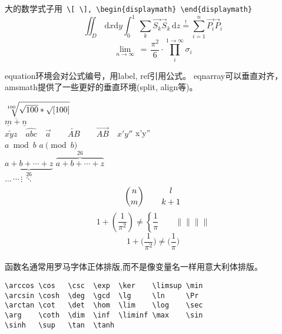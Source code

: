 \documentclass[12pt, a4paper, onecolumn, notitlepage]{article}
\begin{document}
\text{}

大的数学式子用\verb+ \[ \], \begin{displaymath} \end{displaymath}+\\
\[\iint_{D}\,\mathrm{d}x\mathrm{d}y\int_0^1\,\sum_k\vec {S_k}\vec S_k\,\mathrm{d}z\stackrel{!}{=}\sum_{i=1}^n\vec {P_i}{\vec P}_i\]
\begin{displaymath}
\lim_{n \to \infty}\,=\,\frac{\pi^2}{6}\cdot\prod_{i}^{1\rightarrow \infty}\sigma_i
\end{displaymath}

\text{}

equation环境会对公式编号，用label, ref引用公式。
eqnarray可以垂直对齐，amsmath提供了一些更好的垂直环境(split, align等)。

\text{}

$\sqrt[100]{\sqrt{100}*\surd[100]}$ \\[10pt]%
$\overline{\underline{m}+\underline{n}}$ \\
$\widetilde{xyz} \quad \widehat{abc} \quad \vec a \qquad \overleftarrow{AB} \qquad \overrightarrow{AB} \quad x'y''$ \quad x'y'' \\
$a\bmod b$ \qquad \qquad $a\pmod b$ \\
$\underbrace{ a+b+\cdots+z }_{26}$ \quad $\overbrace{ a+b+\cdots+z }^{26}$ \\
$\ldots\,\cdots\,\vdots\,\ddots$ \\

\[{n \choose m} \qquad {l \atop k+1}\]
\begin{displaymath}
1+\left(\frac{1}{\pi^2}\right)\neq\left\{\frac{1}{\pi}\right.\qquad\big\|\Big\|\bigg\|\Bigg\|
\end{displaymath}  
\begin{displaymath}
1+\big(\frac{1}{\pi^2}\Big)\neq\bigg(\frac{1}{\pi}\Bigg)
\end{displaymath}  
\\[30pt]

函数名通常用罗马字体正体排版,而不是像变量名一样用意大利体排版。
\begin{verbatim}
\arccos \cos   \csc  \exp  \ker    \limsup \min
\arcsin \cosh  \deg  \gcd  \lg     \ln     \Pr
\arctan \cot   \det  \hom  \lim    \log    \sec
\arg    \coth  \dim  \inf  \liminf \max    \sin
\sinh   \sup   \tan  \tanh 
\end{verbatim}
\end{document}
